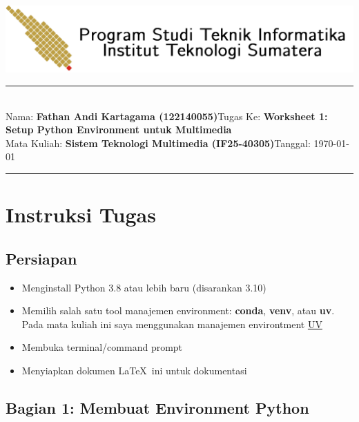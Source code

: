 \documentclass[11pt,a4paper]{article}
\newcommand{\student}{\textbf{Fathan Andi Kartagama (122140055)}}
\newcommand{\course}{\textbf{Sistem Teknologi Multimedia (IF25-40305)}}
\newcommand{\assignment}{\textbf{Worksheet 1: Setup Python Environment untuk Multimedia}}
\begin{document}
\thispagestyle{empty}
\begin{center}
	\includegraphics[scale = 0.15]{Figure/ifitera-header.png}
	\vspace{0.1cm}
\end{center}
\noindent
\rule{17cm}{0.2cm}\\[0.3cm]
Nama: \student \hfill Tugas Ke: \assignment\\[0.1cm]
Mata Kuliah: \course \hfill Tanggal: \today\\
\rule{17cm}{0.05cm}
\vspace{0.1cm}



\section{Instruksi Tugas}

\subsection{Persiapan}
\begin{itemize}
    \item Menginstall Python 3.8 atau lebih baru (disarankan 3.10)
    \item Memilih salah satu tool manajemen environment: \textbf{conda}, \textbf{venv}, atau \textbf{uv}. Pada mata kuliah ini saya menggunakan manajemen environtment \href{https://docs.astral.sh/uv/}{UV}
    \item Membuka terminal/command prompt
    \item Menyiapkan dokumen \LaTeX\ ini untuk dokumentasi
\end{itemize}

\subsection{Bagian 1: Membuat Environment Python}
\end{document}
